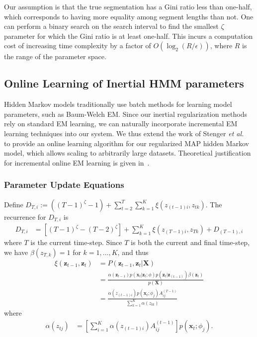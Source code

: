 \documentclass[12pt]{article}
\begin{document}
Our assumption is that the true segmentation has a Gini ratio less than one-half, which corresponds to having more equality among segment lengths than not. One can perform a binary search on the search interval to find the smallest $\zeta$ parameter for which the Gini ratio is at least one-half. This incurs a computation cost of increasing time complexity by a factor of $O(\log_2 (R / \epsilon))$, where $R$ is the range of the parameter space.

\subsection{Online Learning of Inertial HMM parameters}

Hidden Markov models traditionally use batch methods for learning model parameters, such as Baum-Welch EM. Since our inertial regularization methods rely on standard EM learning, we can naturally incorporate incremental EM learning techniques into our system. We thus extend the work of Stenger \emph{et al.}~\cite{stenger2001} to provide an online learning algorithm for our regularized MAP hidden Markov model, which allows scaling to arbitrarily large datasets. Theoretical justification for incremental online EM learning is given in~\cite{Neal:1999:VEA:308574.308679}.

\subsubsection{Parameter Update Equations}

Define $D_{T,i} := ((T-1)^\zeta -1) + \sum_{t=2}^{T}\sum_{k=1}^{K} \xi(z_{(t-1)i}, z_{tk})$. The recurrence for $D_{T,i}$ is
\begin{align*}
    D_{T,i} &= [(T-1)^\zeta - (T-2)^\zeta] +  \sum_{k=1}^{K} \xi(z_{(T-1)i}, z_{Tk}) + D_{(T-1), i}
\end{align*}
where $T$ is the current time-step. Since $T$ is both the current and final time-step, we have $\beta(z_{T,k}) = 1$ for $k = 1, \ldots, K$, and thus
\begin{align*}
    \xi(\mathbf{z}_{t-1}, \mathbf{z}_{t}) 
            &= P(\mathbf{z}_{t-1}, \mathbf{z}_{t} | \mathbf{X}) \\
            &= \frac{\alpha(\mathbf{z}_{t-1})p(\mathbf{x}_t|\mathbf{z}_t; \phi)p(\mathbf{z}_{t}|\mathbf{z}_{(t-1)})\beta(\mathbf{z}_t)}{p(\mathbf{X})} \\
            &= \frac{\alpha(z_{(t-1)i})p(\mathbf{x}_t; \phi_j)A_{ij}^{(T-1)}}{\sum_{k=1}^{K}\alpha(z_{tk})}
\end{align*}
where
\begin{align*}
    \alpha(z_{tj}) &= \left[\sum_{i=1}^{K} \alpha(z_{(t-1)i})A_{ij}^{(t-1)}\right]p(\mathbf{x}_t; \phi_j).
\end{align*}
\end{document}
